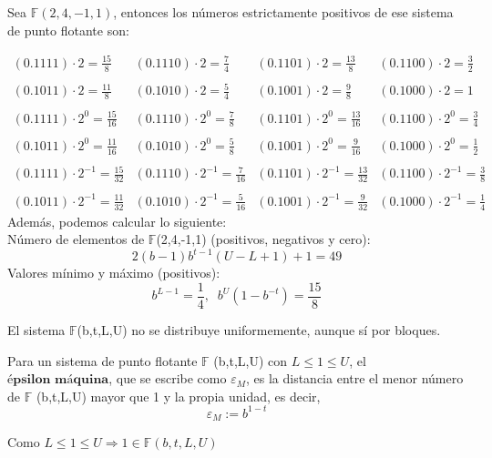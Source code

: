 \begin{ejemplo}
Sea $\mathbb{F} (2,4,-1,1)$, entonces los números estrictamente positivos de ese sistema de punto flotante son:

\[ \begin{array}{llll}
(0.1111) \cdot 2 = \frac{15}{8} & (0.1110) \cdot 2 = \frac{7}{4} & (0.1101) \cdot 2 = \frac{13}{8} & (0.1100) \cdot 2 = \frac{3}{2} \\
\\ (0.1011) \cdot 2 = \frac{11}{8} & (0.1010) \cdot 2 = \frac{5}{4} & (0.1001) \cdot 2 = \frac{9}{8} & (0.1000) \cdot 2 = 1 \\
\\ (0.1111) \cdot 2^0 = \frac{15}{16} & (0.1110) \cdot 2^0 = \frac{7}{8} & (0.1101) \cdot 2^0 = \frac{13}{16} & (0.1100) \cdot 2^0 = \frac{3}{4}\\
\\ (0.1011) \cdot 2^0 = \frac{11}{16} & (0.1010) \cdot 2^0 = \frac{5}{8} & (0.1001) \cdot 2^0 = \frac{9}{16} & (0.1000) \cdot 2^0 = \frac{1}{2}\\
\\ (0.1111) \cdot 2^{-1} = \frac{15}{32} & (0.1110) \cdot 2^{-1} = \frac{7}{16} & (0.1101) \cdot 2^{-1} = \frac{13}{32} & (0.1100) \cdot 2^{-1} = \frac{3}{8}\\
\\ (0.1011) \cdot 2^{-1} = \frac{11}{32} & (0.1010) \cdot 2^{-1} = \frac{5}{16} & (0.1001) \cdot 2^{-1} = \frac{9}{32} & (0.1000) \cdot 2^{-1} = \frac{1}{4}
\end{array} \]
Además, podemos calcular lo siguiente:\\
Número de elementos de $\mathbb{F}$(2,4,-1,1) (positivos, negativos y cero):
\[ 2(b-1)b^{t-1}(U-L+1) + 1 = 49 \]
Valores mínimo y máximo (positivos):
\[ b^{L-1} = \frac{1}{4}, \; \; b^U(1-b^{-t}) = \frac{15}{8} \]
\end{ejemplo}

El sistema $\mathbb{F}$(b,t,L,U) no se distribuye uniformemente, aunque sí por bloques.

\begin{ndef}
Para un sistema de punto flotante $\mathbb{F}$ (b,t,L,U) con $L \leq 1 \leq U$, el $\textbf{épsilon máquina}$, que se escribe como $\varepsilon _M$, es la distancia entre el menor número de $\mathbb{F}$ (b,t,L,U) mayor que 1 y la propia unidad, es decir,
\[ \varepsilon _M := b^{1-t} \]
\end{ndef}

Como $L \leq 1 \leq U \Rightarrow 1 \in \mathbb{F} (b,t,L,U)$ 

